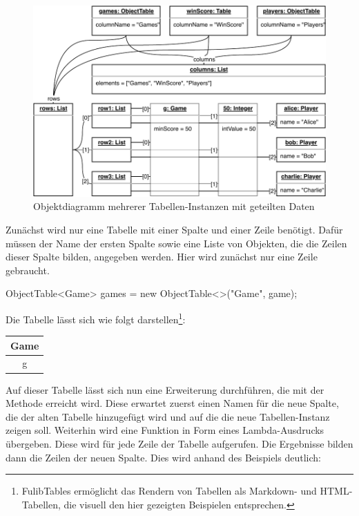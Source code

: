 \begin{figure}
    \includegraphics[width=\textwidth]{chapter/pattern-matching/img/tables-object-diagram.pdf}
    \caption{Objektdiagramm mehrerer Tabellen-Instanzen mit geteilten Daten}
    \label{fig:tables-object-diagram}
\end{figure}

Zunächst wird nur eine Tabelle mit einer Spalte und einer Zeile benötigt.
Dafür müssen der Name der ersten Spalte sowie eine Liste von Objekten, die die Zeilen dieser Spalte bilden, angegeben werden.
Hier wird zunächst nur eine Zeile gebraucht.

\begin{jcodeblock}
    ObjectTable<Game> games = new ObjectTable<>("Game", game);
\end{jcodeblock}

Die Tabelle lässt sich wie folgt darstellen\footnote{FulibTables ermöglicht das Rendern von Tabellen als Markdown- und HTML-Tabellen, die visuell den hier gezeigten Beispielen entsprechen.}:

\begin{tabular}{|c|}
    \hline
    \textbf{Game} \\
    \hline
    g \\
    \hline
\end{tabular}

Auf dieser Tabelle lässt sich nun eine Erweiterung durchführen, die mit der Methode  erreicht wird.
Diese erwartet zuerst einen Namen für die neue Spalte, die der alten Tabelle hinzugefügt wird und auf die die neue Tabellen-Instanz zeigen soll.
Weiterhin wird eine Funktion in Form eines Lambda-Ausdrucks übergeben.
Diese wird für jede Zeile der Tabelle aufgerufen.
Die Ergebnisse bilden dann die Zeilen der neuen Spalte.
Dies wird anhand des Beispiels deutlich:

